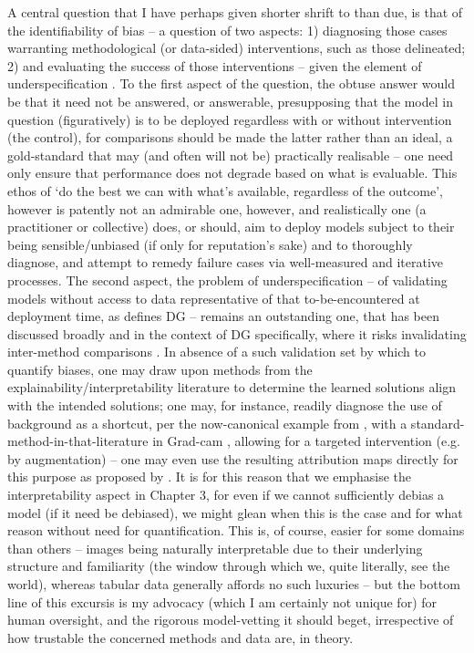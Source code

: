 %
A central question that I have perhaps given shorter shrift to than due, is that of the
identifiability of bias -- a question of two aspects: 1) diagnosing those cases warranting
methodological (or data-sided) interventions, such as those delineated; 2) and evaluating the
success of those interventions -- given the element of underspecification
\citep{semenova2019study}.
%
To the first aspect of the question, the obtuse answer would be that it need not be answered, or
answerable, presupposing that the model in question (figuratively) is to be deployed regardless
with or without intervention (the control), for comparisons should be made \wrt{} the latter rather
than \wrt{} an ideal, a gold-standard that may (and often will not be) practically realisable --
one need only ensure that performance does not degrade based on what is evaluable.
%
%
This ethos of `do the best we can with what's available, regardless of the outcome', however is
patently not an admirable one, however, and realistically one (a practitioner or collective) does,
or should, aim to deploy models subject to their being sensible/unbiased (if only for reputation's
sake) and to thoroughly diagnose, and attempt to remedy failure cases via well-measured and
iterative processes.
%
The second aspect, the problem of underspecification -- of validating models without access to data
representative of that to-be-encountered at deployment time, as defines DG -- remains an
outstanding one, that has been discussed broadly and in the context of DG specifically, where it
risks invalidating inter-method comparisons \citep{gulrajani2020search}.
%
%
In absence of a such validation set by which to quantify biases, one may draw upon methods from the
explainability/interpretability literature \citep{gunning2019xai} to determine the learned
solutions align with the intended solutions; one may, for instance, readily diagnose the use of
background as a shortcut, per the now-canonical example from \cite{beery2018recognition}, with a
standard-method-in-that-literature in Grad-cam \cite{selvaraju2017grad}, allowing for a targeted
intervention (e.g. by augmentation) -- one may even use the resulting attribution maps directly for
this purpose as proposed by \cite{taghanaki2022masktune}.
%
It is for this reason that we emphasise the interpretability aspect in Chapter 3, for even if we
cannot sufficiently debias a model (if it need be debiased), we might glean when this is the case
and for what reason without need for quantification.
%
This is, of course, easier for some domains than others -- images being naturally interpretable due
to their underlying structure and familiarity (the window through which we, quite literally, see
the world), whereas tabular data generally affords no such luxuries -- but the bottom line of this
excursis is my advocacy (which I am certainly not unique for) for human oversight, and the rigorous
model-vetting it should beget, irrespective of how trustable the concerned methods and data are, in
theory.
%


